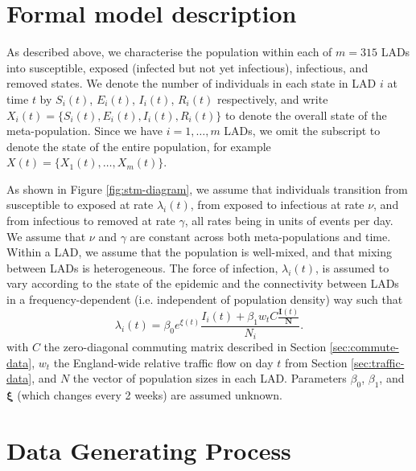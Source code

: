 \documentclass[a4paper]{article}
\begin{document}
\begin{appendices}
\section{Formal model description}

As described above, we characterise the population within each of $m=315$ LADs into
susceptible, exposed (infected but not yet infectious), infectious, and removed states.
We denote the number of
individuals in each state in LAD $i$ at time $t$ by $S_i(t)$, $E_i(t)$,
$I_i(t)$, $R_i(t)$ respectively, and write $X_i(t) = \{S_i(t), E_i(t), I_i(t), R_i(t)\}$
to denote the overall state of the meta-population.  Since we have $i=1,\dots,m$
LADs, we omit the subscript to denote the state of the entire population, for
example $X(t) = \{X_1(t),\dots,X_m(t)\}$.

As shown in Figure \ref{fig:stm-diagram}, we assume that individuals transition from
susceptible to exposed at rate $\lambda_i(t)$, from exposed to infectious
at rate $\nu$, and from infectious to removed at rate $\gamma$, all rates being in units
of events per day.  We assume that
$\nu$ and $\gamma$ are constant across both meta-populations and time.  Within a LAD, we
assume that the population is well-mixed, and that mixing between LADs is heterogeneous.
The force of infection, $\lambda_i(t)$, is
assumed to vary according to the state of the epidemic and the connectivity between LADs
in a frequency-dependent (i.e. independent of population density) way such that
\begin{equation}
  \lambda_i(t) = \beta_0 e^{\xi(t)} \frac{ I_i(t) + \beta_1 w_t C \frac{\bm{I}(t)}{\bm{N}}}{N_i}.
\end{equation}
with $C$ the zero-diagonal commuting matrix described in Section
\ref{sec:commute-data}, $w_t$ the England-wide relative traffic flow on day $t$
from Section \ref{sec:traffic-data}, and $N$ the vector of population sizes in each
LAD.  Parameters $\beta_0$, $\beta_1$, and $\bm{\xi}$ (which changes every 2 weeks) are
assumed unknown.


\section{Data Generating Process}\label{app:data-generating-model}


\end{appendices}
\end{document}
